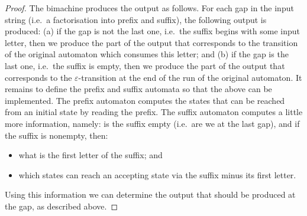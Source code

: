 \begin{proof}
The bimachine produces the output as follows. For each gap in the input string (i.e.~a factorisation into prefix and suffix), the following output is produced: (a) if the gap is not the last one, i.e.~the suffix begins with some input letter, then we produce the part of the output that corresponds to the transition of the original automaton which consumes this letter; and (b) if the gap is the last one, i.e.~the suffix is empty, then we produce the part of the output that corresponds to the $\varepsilon$-transition at the end of the run of the original automaton. It remains to define the prefix and suffix automata so that the above can be implemented.  The prefix automaton computes the states that can be reached from an initial state by reading the prefix. The suffix automaton computes a little more information, namely: is the suffix empty (i.e.~are we at the last gap), and if the suffix is nonempty, then: 
    \begin{itemize}
        \item what is the first  letter of the suffix; and
        \item which states can reach an accepting state via the suffix minus its first letter.   
    \end{itemize}
Using this information we can determine the output that should be produced at the gap, as described above.
\end{proof}


